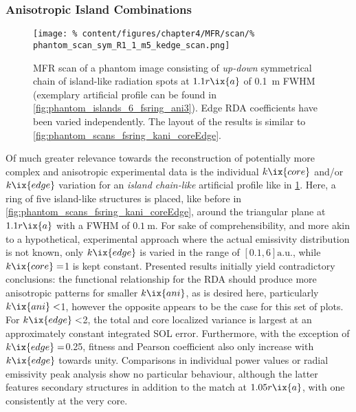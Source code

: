             \subsubsection*{Anisotropic Island Combinations}%
%
                \begin{figure}[t]%
                    \centering%
                    \captionsetup{width=.47\textwidth}%
                    \begin{minipage}[c]{0.47\textwidth}%
                        \centering%
                        \caption{MFR scan of a phantom image consisting of \textit{up-down} symmetrical chain of island-like radiation spots at $1.1r\ix{a}$ of \SI{0.1}{\meter} FWHM (exemplary artificial profile can be found in \cref{fig:phantom_islands_6_fsring_ani3}). Edge RDA coefficients have been varied independently. The layout of the results is similar to \cref{fig:phantom_scans_fsring_kani_coreEdge}.}\label{fig:phantom_scans_sym5_kani_edge}%
                    \end{minipage}%
                    \hfill%
                    \begin{minipage}[c]{0.47\textwidth}%
                        \centering%
                        \texttt{[image: \%
                            content/figures/chapter4/MFR/scan/\%
                            phantom\_scan\_sym\_R1\_1\_m5\_kedge\_scan.png]}%
                    \end{minipage}%
                \end{figure}%
%
                Of much greater relevance towards the reconstruction of potentially more complex and anisotropic experimental data is the individual $k\ix{core}$ and/or $k\ix{edge}$ variation for an \textit{island chain-like} artificial profile like in \cref{fig:phantom_scans_sym5_kani_edge}. Here, a ring of five island-like structures is placed, like before in \cref{fig:phantom_scans_fsring_kani_coreEdge}, around the triangular plane at $1.1r\ix{a}$ with a FWHM of $\SI{0.1}{\meter}$. For sake of comprehensibility, and more akin to a hypothetical, experimental approach where the actual emissivity distribution is not known, only $k\ix{edge}$ is varied in the range of $\left[0.1, 6\right]\text{a.u.}$, while $k\ix{core}=$\SI{1}{\arbitraryunit} is kept constant. Presented results initially yield contradictory conclusions: the functional relationship for the RDA should produce more anisotropic patterns for smaller $k\ix{ani}$, as is desired here, particularly $k\ix{ani}<$\SI{1}{\arbitraryunit}, however the opposite appears to be the case for this set of plots. For $k\ix{edge}<$\SI{2}{\arbitraryunit}, the total and core localized variance is largest at an approximately constant integrated SOL error. Furthermore, with the exception of $k\ix{edge}=$\SI{0.25}{\arbitraryunit}, fitness and Pearson coefficient also only increase with $k\ix{edge}$ towards unity. Comparisons in individual power values or radial emissivity peak analysis show no particular behaviour, although the latter features secondary structures in addition to the match at $1.05r\ix{a}$, with one consistently at the very core.\\%
